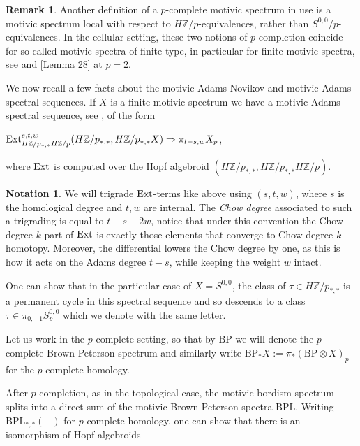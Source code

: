 \documentclass[oneside,a4paper]{amsart}
\newcommand{\Ext}{\textnormal{Ext}} %
\newcommand{\BPL}{\mathrm{BPL}} %
\newcommand{\BP}{\mathrm{BP}} %
\newcommand{\integralem}{H \mathbb{Z}} %
\theoremstyle{plain}
\theoremstyle{definition}
\newtheorem{rem}[thm]{Remark}
\newtheorem{notation}[thm]{Notation}
\theoremstyle{remark}
\begin{document}
\begin{rem}
Another definition of a $p$-complete motivic spectrum in use is a motivic spectrum local with respect to $\integralem / p$-equivalences, rather than $S^{0, 0} / p$-equivalences. In the cellular setting, these two notions of $p$-completion coincide for so called motivic spectra of finite type, in particular for finite motivic spectra, see \cite{hu2011convergence} and \cite{hu2011remarks}[Lemma 28] at $p = 2$. 
\end{rem}

We now recall a few facts about the motivic Adams-Novikov and motivic Adams spectral sequences. If $X$ is a finite motivic spectrum we have a motivic Adams spectral sequence, see \cite{dugger2010motivic}, of the form

\begin{center}
$\Ext_{\integralem / p _{*, *} \integralem / p} ^{s, t, w} (\integralem / p _{*, *}, \integralem / p _{*, *} X) \Rightarrow \pi_{t-s, w} X_{p}$,
\end{center}
where $\Ext$ is computed over the Hopf algebroid $(\integralem / p _{*, *}, \integralem / p _{*, *} \integralem / p)$. 

\begin{notation}
We will trigrade $\Ext$-terms like above using $(s, t, w)$, where $s$ is the homological degree and $t, w$ are internal. The \emph{Chow degree} associated to such a trigrading is equal to $t - s - 2w$, notice that under this convention the Chow degree $k$ part of $\Ext$ is exactly those elements that converge to Chow degree $k$ homotopy. Moreover, the differential lowers the Chow degree by one, as this is how it acts on the Adams degree $t - s$, while keeping the weight $w$ intact. 
\end{notation}
One can show that in the particular case of $X = S^{0, 0}$, the class of $\tau \in \integralem / p _{*, *} $ is a permanent cycle in this spectral sequence and so descends to a class $\tau \in \pi_{0, -1} S^{0, 0}_{p}$ which we denote with the same letter. 

Let us work in the $p$-complete setting, so that by $\BP$ we will denote the $p$-complete Brown-Peterson spectrum and similarly write $\BP_{*}X := \pi_{*}(\BP \otimes X)_{p}$ for the $p$-complete homology. 

After $p$-completion, as in the topological case, the motivic bordism spectrum splits into a direct sum of the motivic Brown-Peterson spectra $\BPL$. Writing $\BPL_{*, *}(-)$ for $p$-complete homology, one can show that there is an isomorphism of Hopf algebroids
\end{document}
